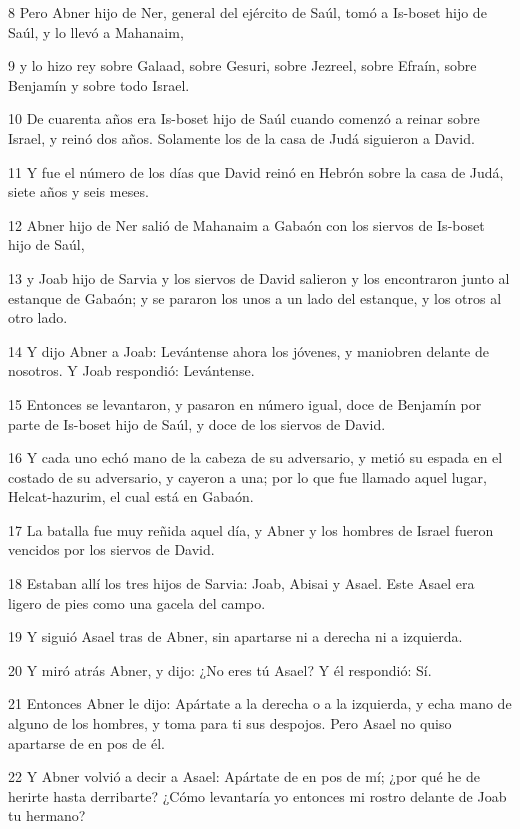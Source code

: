 \par 8 Pero Abner hijo de Ner, general del ejército de Saúl, tomó a Is-boset hijo de Saúl, y lo llevó a Mahanaim,
\par 9 y lo hizo rey sobre Galaad, sobre Gesuri, sobre Jezreel, sobre Efraín, sobre Benjamín y sobre todo Israel.
\par 10 De cuarenta años era Is-boset hijo de Saúl cuando comenzó a reinar sobre Israel, y reinó dos años. Solamente los de la casa de Judá siguieron a David.
\par 11 Y fue el número de los días que David reinó en Hebrón sobre la casa de Judá, siete años y seis meses.
\par 12 Abner hijo de Ner salió de Mahanaim a Gabaón con los siervos de Is-boset hijo de Saúl,
\par 13 y Joab hijo de Sarvia y los siervos de David salieron y los encontraron junto al estanque de Gabaón; y se pararon los unos a un lado del estanque, y los otros al otro lado.
\par 14 Y dijo Abner a Joab: Levántense ahora los jóvenes, y maniobren delante de nosotros. Y Joab respondió: Levántense.
\par 15 Entonces se levantaron, y pasaron en número igual, doce de Benjamín por parte de Is-boset hijo de Saúl, y doce de los siervos de David.
\par 16 Y cada uno echó mano de la cabeza de su adversario, y metió su espada en el costado de su adversario, y cayeron a una; por lo que fue llamado aquel lugar, Helcat-hazurim, el cual está en Gabaón.
\par 17 La batalla fue muy reñida aquel día, y Abner y los hombres de Israel fueron vencidos por los siervos de David.
\par 18 Estaban allí los tres hijos de Sarvia: Joab, Abisai y Asael. Este Asael era ligero de pies como una gacela del campo.
\par 19 Y siguió Asael tras de Abner, sin apartarse ni a derecha ni a izquierda.
\par 20 Y miró atrás Abner, y dijo: ¿No eres tú Asael? Y él respondió: Sí.
\par 21 Entonces Abner le dijo: Apártate a la derecha o a la izquierda, y echa mano de alguno de los hombres, y toma para ti sus despojos. Pero Asael no quiso apartarse de en pos de él.
\par 22 Y Abner volvió a decir a Asael: Apártate de en pos de mí; ¿por qué he de herirte hasta derribarte? ¿Cómo levantaría yo entonces mi rostro delante de Joab tu hermano?
